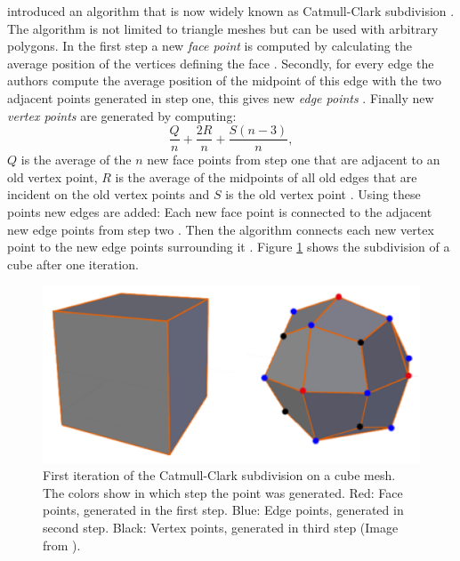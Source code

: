 \citeauthor{CATMULL1978350} introduced an algorithm that is now widely known as Catmull-Clark subdivision \cite{CATMULL1978350}.
The algorithm is not limited to triangle meshes but can be used with arbitrary polygons.
In the first step a new \textit{face point} is computed by calculating the average position of the vertices defining the face \cite{CATMULL1978350}.
Secondly, for every edge the authors compute the average position of the midpoint of this edge with the two adjacent points generated in step one, this gives new \textit{edge points} \cite{CATMULL1978350}.
Finally new \textit{vertex points} are generated by computing:
\begin{equation*}
	\frac{Q}{n} + \frac{2R}{n} + \frac{S(n-3)}{n},
\end{equation*}
$Q$ is the average of the $n$ new face points from step one that are adjacent to an old vertex point, $R$ is the average of the midpoints of all old edges that are incident on the old vertex points and $S$ is the old vertex point \cite{CATMULL1978350}.
Using these points new edges are added: Each new face point is connected to the adjacent new edge points from step two \cite{CATMULL1978350}.
Then the algorithm connects each new vertex point to the new edge points surrounding it \cite{CATMULL1978350}.
Figure \ref{fig:catmull_clark_subdivision} shows the subdivision of a cube after one iteration.
\begin{figure}[ht]
    \centering
    \includegraphics[width=0.5\linewidth]{img/catmull_clark_subdivision.png}
    \caption[First iteration of the Catmull-Clark subdivision]{First iteration of the Catmull-Clark subdivision on a cube mesh. The colors show in which step the point was generated. Red: Face points, generated in the first step. Blue: Edge points, generated in second step. Black: Vertex points, generated in third step (Image from \cite{cheng_catmull_clark_visualization}).}
    \label{fig:catmull_clark_subdivision}
\end{figure}

